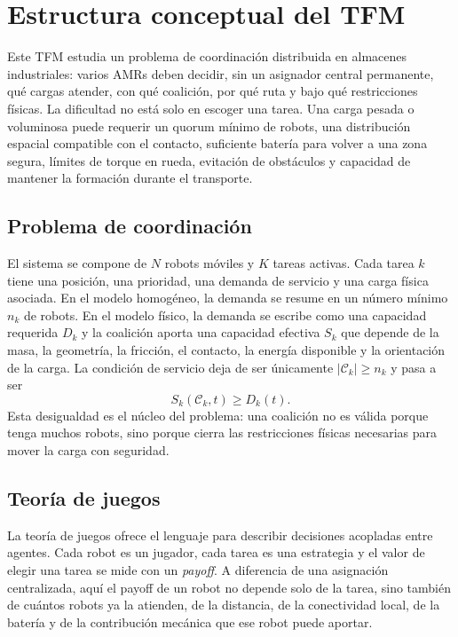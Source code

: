 \section*{Estructura conceptual del TFM}
\label{sec:estructura-conceptual}

Este TFM estudia un problema de coordinación distribuida en almacenes industriales:
varios AMRs deben decidir, sin un asignador central permanente, qué cargas atender, con
qué coalición, por qué ruta y bajo qué restricciones físicas. La dificultad no está solo
en escoger una tarea. Una carga pesada o voluminosa puede requerir un quorum mínimo de
robots, una distribución espacial compatible con el contacto, suficiente batería para
volver a una zona segura, límites de torque en rueda, evitación de obstáculos y
capacidad de mantener la formación durante el transporte.

\subsection*{Problema de coordinación}

El sistema se compone de $N$ robots móviles y $K$ tareas activas. Cada tarea $k$ tiene
una posición, una prioridad, una demanda de servicio y una carga física asociada. En el
modelo homogéneo, la demanda se resume en un número mínimo $n_k$ de robots. En el modelo
físico, la demanda se escribe como una capacidad requerida $D_k$ y la coalición aporta
una capacidad efectiva $S_k$ que depende de la masa, la geometría, la fricción, el
contacto, la energía disponible y la orientación de la carga. La condición de servicio
deja de ser únicamente $|\mathcal C_k|\ge n_k$ y pasa a ser
\[
  S_k(\mathcal C_k,t)\ge D_k(t).
\]
Esta desigualdad es el núcleo del problema: una coalición no es válida porque tenga
muchos robots, sino porque cierra las restricciones físicas necesarias para mover la
carga con seguridad.

\subsection*{Teoría de juegos}

La teoría de juegos ofrece el lenguaje para describir decisiones acopladas entre
agentes. Cada robot es un jugador, cada tarea es una estrategia y el valor de elegir una
tarea se mide con un \emph{payoff}. A diferencia de una asignación centralizada, aquí el
payoff de un robot no depende solo de la tarea, sino también de cuántos robots ya la
atienden, de la distancia, de la conectividad local, de la batería y de la contribución
mecánica que ese robot puede aportar.

